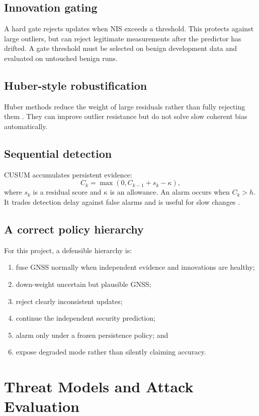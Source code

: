 \documentclass[11pt,oneside]{book}
\begin{document}
\section{Innovation gating}

A hard gate rejects updates when NIS exceeds a threshold. This protects
against large outliers, but can reject legitimate measurements after the
predictor has drifted. A gate threshold must be selected on benign development
data and evaluated on untouched benign runs.

\section{Huber-style robustification}

Huber methods reduce the weight of large residuals rather than fully rejecting
them \cite{gandhi2010}. They can improve outlier resistance but do not solve
slow coherent bias automatically.

\section{Sequential detection}

CUSUM accumulates persistent evidence:
\[
C_k=\max(0,C_{k-1}+s_k-\kappa),
\]
where $s_k$ is a residual score and $\kappa$ is an allowance. An alarm occurs
when $C_k>h$. It trades detection delay against false alarms and is useful for
slow changes \cite{page1954,murguia2016}.

\section{A correct policy hierarchy}

For this project, a defensible hierarchy is:
\begin{enumerate}
  \item fuse GNSS normally when independent evidence and innovations are
  healthy;
  \item down-weight uncertain but plausible GNSS;
  \item reject clearly inconsistent updates;
  \item continue the independent security prediction;
  \item alarm only under a frozen persistence policy; and
  \item expose degraded mode rather than silently claiming accuracy.
\end{enumerate}

\chapter{Threat Models and Attack Evaluation}
\end{document}
